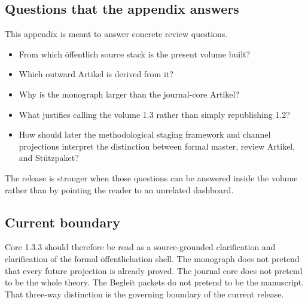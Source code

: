 \subsection{Questions that the appendix answers}

This appendix is meant to answer concrete review questions.

\begin{itemize}
\item From which öffentlich source stack is the present volume built?
\item Which outward Artikel is derived from it?
\item Why is the monograph larger than the journal-core Artikel?
\item What justifies calling the volume 1.3 rather than simply republishing 1.2?
\item How should later the methodological staging framework and channel projections interpret the distinction between formal
      master, review Artikel, and Stützpaket?
\end{itemize}

The release is stronger when those questions can be answered inside the volume rather than by
pointing the reader to an unrelated dashboard.

\subsection{Current boundary}

Core 1.3.3 should therefore be read as a source-grounded clarification and clarification of the formal
öffentlichation shell.
The monograph does not pretend that every future projection is already proved.
The journal core does not pretend to be the whole theory.
The Begleit packets do not pretend to be the manuscript.
That three-way distinction is the governing boundary of the current release.

\clearpage
